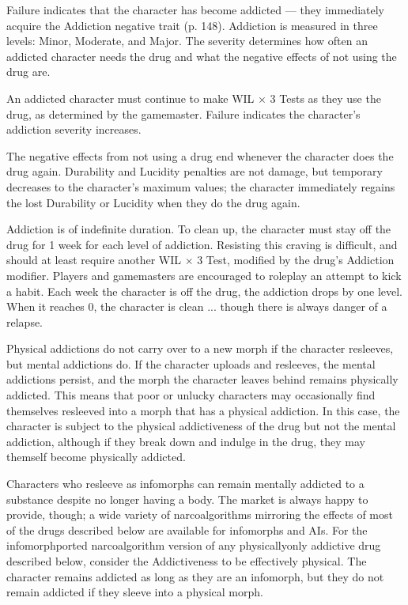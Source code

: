 Failure indicates that the character has become addicted --- they immediately acquire the Addiction negative trait (p. 148). Addiction is measured in three levels: Minor, Moderate, and Major. The severity determines how often an addicted character needs the drug and what the negative effects of not using the drug are. 

An addicted character must continue to make WIL $\times$ 3 Tests as they use the drug, as determined by the gamemaster. Failure indicates the character’s addiction severity increases. 

The negative effects from not using a drug end whenever the character does the drug again. Durability and Lucidity penalties are not damage, but temporary decreases to the character’s maximum values; the character immediately regains the lost Durability or Lucidity when they do the drug again. 

Addiction is of indefinite duration. To clean up, the character must stay off the drug for 1 week for each level of addiction. Resisting this craving is difficult, and should at least require another WIL $\times$ 3 Test, modified by the drug’s Addiction modifier. Players and gamemasters are encouraged to roleplay an attempt to kick a habit. Each week the character is off the drug, the addiction drops by one level. When it reaches 0, the character is clean ... though there is always danger of a relapse. 

Physical addictions do not carry over to a new morph if the character resleeves, but mental addictions do. If the character uploads and resleeves, the mental addictions persist, and the morph the character leaves behind remains physically addicted. This means that poor or unlucky characters may occasionally find themselves resleeved into a morph that has a physical addiction. In this case, the character is subject to the physical addictiveness of the drug but not the mental addiction, although if they break down and indulge in the drug, they may themself become physically addicted. 

Characters who resleeve as infomorphs can remain mentally addicted to a substance despite no longer having a body. The market is always happy to provide, though; a wide variety of narcoalgorithms mirroring the effects of most of the drugs described below are available for infomorphs and AIs. For the infomorphported narcoalgorithm version of any physicallyonly addictive drug described below, consider the Addictiveness to be effectively physical. The character remains addicted as long as they are an infomorph, but they do not remain addicted if they sleeve into a physical morph. 

